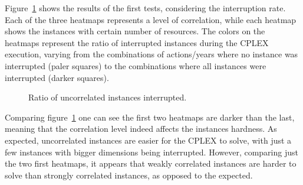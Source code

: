 Figure~\ref{fig:result10} shows the results of the first tests, 
considering the interruption rate. Each of the three heatmaps represents a level of correlation, while each heatmap 
shows the instances with certain number of resources. The colors on the heatmaps represent the ratio of interrupted 
instances during the CPLEX execution, varying from the combinations of actions/years where no instance was interrupted 
(paler squares) to the combinations where all instances were interrupted (darker squares).

\begin{figure}[H]
  \begin{center}
  \resizebox{\columnwidth}{!}{%
    \subfloat[1 resource]{}
    \subfloat[2 resources]{}
    \subfloat[4 resources]{}
  }
  \end{center}
\end{figure}

\figspaces
\begin{figure}[H]
  \begin{center}
  \resizebox{\columnwidth}{!}{%
    \subfloat[1 resource]{}
    \subfloat[2 resources]{}
    \subfloat[4 resources]{}
  }
  \end{center}
\end{figure}

\figspaces
\begin{figure}[H]
  \begin{center}
  \resizebox{\columnwidth}{!}{%
    \subfloat[1 resource]{}
    \subfloat[2 resources]{}
    \subfloat[4 resources]{}
  }
  \end{center}
  \caption{Ratio of uncorrelated instances interrupted.}
  \label{fig:result10}
\end{figure}

Comparing figure~\ref{fig:result10} one can see the first two heatmaps are darker 
than the last, meaning that the correlation level indeed affects the instances hardness. As expected, uncorrelated instances
are easier for the CPLEX to solve, with just a few instances with bigger dimensions being interrupted. However, comparing just
the two first heatmaps, it appears that weakly correlated instances are harder to solve than
strongly correlated instances, as opposed to the expected.

